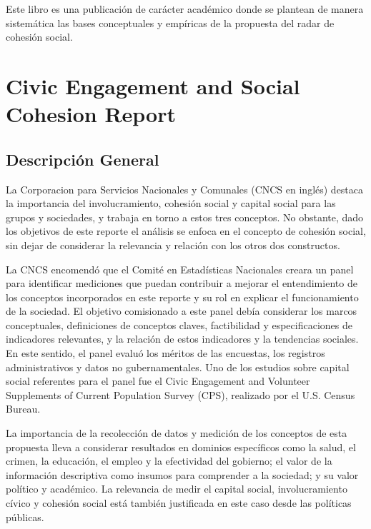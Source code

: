 \documentclass[
  12pt,
]{book}
\begin{document}
Este libro es una publicación de carácter académico donde se plantean de manera sistemática las bases conceptuales y empíricas de la propuesta del radar de cohesión social.

\hypertarget{civic-engagement-and-social-cohesion-report}{%
\chapter{Civic Engagement and Social Cohesion Report}\label{civic-engagement-and-social-cohesion-report}}

\hypertarget{descripciuxf3n-general}{%
\section{Descripción General}\label{descripciuxf3n-general}}

La Corporacion para Servicios Nacionales y Comunales (CNCS en inglés) destaca la importancia del involucramiento, cohesión social y capital social para las grupos y sociedades, y trabaja en torno a estos tres conceptos. No obstante, dado los objetivos de este reporte el análisis se enfoca en el concepto de cohesión social, sin dejar de considerar la relevancia y relación con los otros dos constructos.

La CNCS encomendó que el Comité en Estadísticas Nacionales creara un panel para identificar mediciones que puedan contribuir a mejorar el entendimiento de los conceptos incorporados en este reporte y su rol en explicar el funcionamiento de la sociedad. El objetivo comisionado a este panel debía considerar los marcos conceptuales, definiciones de conceptos claves, factibilidad y especificaciones de indicadores relevantes, y la relación de estos indicadores y la tendencias sociales. En este sentido, el panel evaluó los méritos de las encuestas, los registros administrativos y datos no gubernamentales. Uno de los estudios sobre capital social referentes para el panel fue el Civic Engagement and Volunteer Supplements of Current Population Survey (CPS), realizado por el U.S. Census Bureau.

La importancia de la recolección de datos y medición de los conceptos de esta propuesta lleva a considerar resultados en dominios específicos como la salud, el crimen, la educación, el empleo y la efectividad del gobierno; el valor de la información descriptiva como insumos para comprender a la sociedad; y su valor político y académico. La relevancia de medir el capital social, involucramiento cívico y cohesión social está también justificada en este caso desde las políticas públicas.
\end{document}
